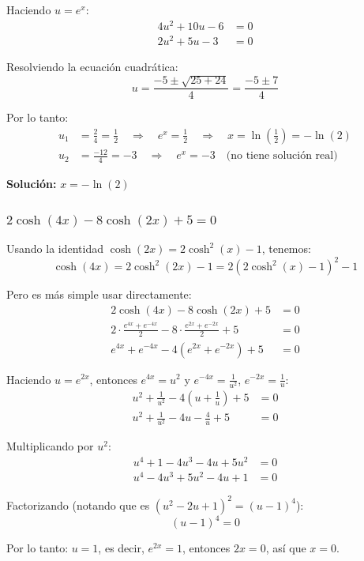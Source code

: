 \documentclass{article}
\begin{document}
Haciendo $u = e^x$:
\begin{align*}
4u^2 + 10u - 6 &= 0 \\
2u^2 + 5u - 3 &= 0
\end{align*}

Resolviendo la ecuación cuadrática:
$$u = \frac{-5 \pm \sqrt{25 + 24}}{4} = \frac{-5 \pm 7}{4}$$

Por lo tanto:
\begin{align*}
u_1 &= \frac{2}{4} = \frac{1}{2} \quad \Rightarrow \quad e^x = \frac{1}{2} \quad \Rightarrow \quad x = \ln\left(\frac{1}{2}\right) = -\ln(2) \\
u_2 &= \frac{-12}{4} = -3 \quad \Rightarrow \quad e^x = -3 \quad \text{(no tiene solución real)}
\end{align*}

\textbf{Solución:} $x = -\ln(2)$

\subsubsection*{$2\cosh(4x) - 8\cosh(2x) + 5 = 0$}

Usando la identidad $\cosh(2x) = 2\cosh^2(x) - 1$, tenemos:
$$\cosh(4x) = 2\cosh^2(2x) - 1 = 2(2\cosh^2(x) - 1)^2 - 1$$

Pero es más simple usar directamente:
\begin{align*}
2\cosh(4x) - 8\cosh(2x) + 5 &= 0 \\
2 \cdot \frac{e^{4x} + e^{-4x}}{2} - 8 \cdot \frac{e^{2x} + e^{-2x}}{2} + 5 &= 0 \\
e^{4x} + e^{-4x} - 4(e^{2x} + e^{-2x}) + 5 &= 0
\end{align*}

Haciendo $u = e^{2x}$, entonces $e^{4x} = u^2$ y $e^{-4x} = \frac{1}{u^2}$, $e^{-2x} = \frac{1}{u}$:
\begin{align*}
u^2 + \frac{1}{u^2} - 4\left(u + \frac{1}{u}\right) + 5 &= 0 \\
u^2 + \frac{1}{u^2} - 4u - \frac{4}{u} + 5 &= 0
\end{align*}

Multiplicando por $u^2$:
\begin{align*}
u^4 + 1 - 4u^3 - 4u + 5u^2 &= 0 \\
u^4 - 4u^3 + 5u^2 - 4u + 1 &= 0
\end{align*}

Factorizando (notando que es $(u^2 - 2u + 1)^2 = (u - 1)^4$):
$$(u - 1)^4 = 0$$

Por lo tanto: $u = 1$, es decir, $e^{2x} = 1$, entonces $2x = 0$, así que $x = 0$.
\end{document}
